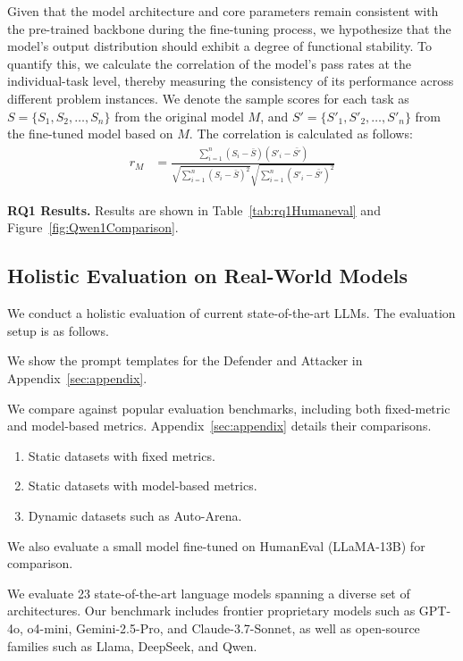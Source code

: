 Given that the model architecture and core parameters remain consistent with the pre-trained backbone during the fine-tuning process, we hypothesize that the model's output distribution should exhibit a degree of functional stability. To quantify this, we calculate the correlation of the model's pass rates at the individual-task level, thereby measuring the consistency of its performance across different problem instances. We denote the sample scores for each task as $S = \{S_1, S_2, \dots, S_n\}$ from the original model $M$, and $S' = \{S'_{1}, S'_{2}, \dots, S'_{n}\}$ from the fine-tuned model based on $M$. The correlation is calculated as follows:
\begin{align}
r_{M} &= \frac{\sum_{i=1}^{n} (S_i - \bar{S})(S'_i - \bar{S'})}{\sqrt{\sum_{i=1}^{n} (S_i - \bar{S})^2} \sqrt{\sum_{i=1}^{n} (S'_i - \bar{S'})^2}} \label{eq:correlation}
\end{align}

\textbf{RQ1 Results.} Results are shown in Table~\ref{tab:rq1Humaneval} and Figure~\ref{fig:Qwen1Comparison}.




\subsection{Holistic Evaluation on Real-World Models}

We conduct a holistic evaluation of current state-of-the-art LLMs. The evaluation setup is as follows.

 We show the prompt templates for the Defender and Attacker in Appendix~\ref{sec:appendix}.

 We compare against popular evaluation benchmarks, including both fixed-metric and model-based metrics. Appendix~\ref{sec:appendix} details their comparisons.

\begin{enumerate}
\item Static datasets with fixed metrics.
\item Static datasets with model-based metrics.
\item Dynamic datasets such as Auto-Arena.
\end{enumerate}

We also evaluate a small model fine-tuned on HumanEval (LLaMA-13B) for comparison.

 We evaluate 23 state-of-the-art language models spanning a diverse set of architectures. Our benchmark includes frontier proprietary models such as GPT-4o, o4-mini, Gemini-2.5-Pro, and Claude-3.7-Sonnet, as well as open-source families such as Llama, DeepSeek, and Qwen.

